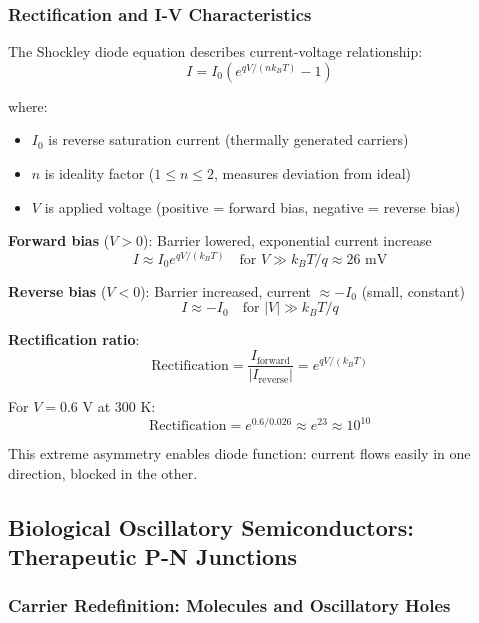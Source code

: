 \documentclass[11pt,a4paper]{article}
\begin{document}
\subsubsection{Rectification and I-V Characteristics}

The Shockley diode equation describes current-voltage relationship:
\begin{equation}
I = I_0 \left(e^{qV/(nk_B T)} - 1\right)
\end{equation}

where:
\begin{itemize}
\item $I_0$ is reverse saturation current (thermally generated carriers)
\item $n$ is ideality factor ($1 \leq n \leq 2$, measures deviation from ideal)
\item $V$ is applied voltage (positive = forward bias, negative = reverse bias)
\end{itemize}

\textbf{Forward bias} ($V > 0$): Barrier lowered, exponential current increase
\begin{equation}
I \approx I_0 e^{qV/(k_B T)} \quad \text{for } V \gg k_B T/q \approx 26 \text{ mV}
\end{equation}

\textbf{Reverse bias} ($V < 0$): Barrier increased, current $\approx -I_0$ (small, constant)
\begin{equation}
I \approx -I_0 \quad \text{for } |V| \gg k_B T/q
\end{equation}

\textbf{Rectification ratio}:
\begin{equation}
\text{Rectification} = \frac{I_{\text{forward}}}{|I_{\text{reverse}}|} = e^{qV/(k_B T)}
\end{equation}

For $V = 0.6$ V at 300 K:
\begin{equation}
\text{Rectification} = e^{0.6/0.026} \approx e^{23} \approx 10^{10}
\end{equation}

This extreme asymmetry enables diode function: current flows easily in one direction, blocked in the other.

\subsection{Biological Oscillatory Semiconductors: Therapeutic P-N Junctions}

\subsubsection{Carrier Redefinition: Molecules and Oscillatory Holes}
\end{document}
